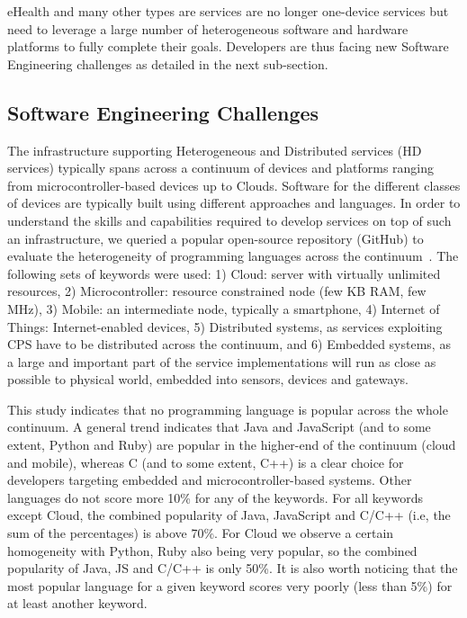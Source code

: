 eHealth and many other types are services are no longer one-device services but need to leverage a large number of heterogeneous software and hardware platforms to fully complete their goals. Developers are thus facing new Software Engineering challenges as detailed in the next sub-section. 

\subsection{Software Engineering Challenges}

The infrastructure supporting Heterogeneous and Distributed services (HD services) typically spans across a continuum of devices and platforms ranging from microcontroller-based devices up to Clouds. Software for the different classes of devices are typically built using different approaches and languages. In order to understand the skills and capabilities required to develop services on top of such an infrastructure, we queried a popular open-source repository (GitHub) to evaluate the heterogeneity of programming languages across the continuum~\cite{DBLP:conf/icse/MorinFB15}. The following sets of keywords were used: 1) Cloud: server with virtually unlimited resources, 2) Microcontroller: resource constrained node (few KB RAM, few MHz), 3) Mobile: an intermediate node, typically a smartphone, 4) Internet of Things: Internet-enabled devices, 5) Distributed systems, as services exploiting CPS have to be distributed across the continuum, and 6) Embedded systems, as a large and important part of the service implementations will run as close as possible to physical world, embedded into sensors, devices and gateways. 

This study indicates that no programming language is popular across the whole continuum. A general trend indicates that Java and JavaScript (and to some extent, Python and Ruby) are popular in the higher-end of the continuum (cloud and mobile), whereas C (and to some extent, C++) is a clear choice for developers targeting embedded and microcontroller-based systems. Other languages do not score more 10\% for any of the keywords. For all keywords except Cloud, the combined popularity of Java, JavaScript and C/C++ (i.e, the sum of the percentages) is above 70\%. For Cloud we observe a certain homogeneity with Python, Ruby also being very popular, so the combined popularity of Java, JS and C/C++ is only 50\%. It is also worth noticing that the most popular language for a given keyword scores very poorly (less than 5\%) for at least another keyword. 

